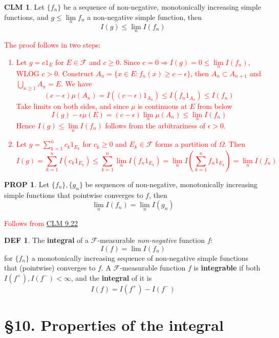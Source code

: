 \documentclass[hidelinks]{article}
\theoremstyle{definition}
\newtheorem*{defin}{DEF}
\theoremstyle{dotless}
\newtheorem{proposition}{PROP}[section]
\newtheorem{claim}{CLM}[section]
\theoremstyle{remark}
\begin{document}
\begin{claim}\label{CLM 9.22}
Let $\{f_n\}$ be a sequence of non-negative, monotonically increasing simple functions, and $g\leq\lim\limits_nf_n$ a non-negative simple function, then
\[I(g)\leq\lim\limits_nI(f_n)\]
\end{claim}
\textcolor{red}{The proof follows in two steps:\begin{enumerate}[label=\arabic*\degree]
    \item Let $g=c1_E$ for $E\in\mathscr{F}$ and $c\geq0$. Since $c=0\Rightarrow I(g)=0\leq\lim\limits_nI(f_n)$, WLOG $c>0$.\newline
    Construct $A_n=\{x\in E:f_n(x)\geq c-\epsilon\}$, then $A_n\subset A_{n+1}$ and $\bigcup\limits_{n\geq1}A_n=E$. We have
    \[(c-\epsilon)\mu(A_n)=I((c-\epsilon)1_{A_n})\leq I(f_n1_{A_n})\leq I(f_n)\]
    Take limits on both sides, and since $\mu$ is continuous at $E$ from below
    \[I(g)-\epsilon\mu(E)=(c-\epsilon)\lim_n\mu(A_n)\leq\lim_nI(f_n)\]
    Hence $I(g)\leq\lim\limits_nI(f_n)$ follows from the arbitrariness of $\epsilon>0$.
    \item Let $g=\sum\limits_{k=1}^nc_k1_{E_k}$ for $c_k\geq0$ and $E_k\in\mathcal{F}$ forms a partition of $\Omega$. Then
    \[I(g)=\sum_{k=1}^nI(c_k1_{E_k})\leq\sum_{k=1}^n\lim_nI(f_n1_{E_k})=\lim_nI(\sum_{k=1}^nf_n1_{E_k})=\lim_nI(f_n)\]
\end{enumerate}}

\begin{proposition}
Let $\{f_n\},\{g_n\}$ be sequences of non-negative, monotonically increasing simple functions that pointwise converges to $f$, then
\[\lim_nI(f_n)=\lim_nI(g_n)\]
\end{proposition}
\textcolor{red}{Follows from \hyperref[CLM 9.22]{CLM 9.22}}

\begin{defin}
The \textbf{integral} of a $\mathscr{F}$-measurable \emph{non-negative} function $f$: \[I(f)=\lim I(f_n)\]
for $\{f_n\}$ a monotonically increasing sequence of non-negative simple functions that (pointwise) converges to $f$.\newline
A $\mathscr{F}$-measurable function $f$ is \textbf{integrable} if both $I(f^+),I(f^-)<\infty$, and the \textbf{integral} of it is
\[I(f)=I(f^+)-I(f^-)\]
\end{defin}

\bigbreak

\section*{\S10. Properties of the integral}
\setcounter{section}{10}
\end{document}
